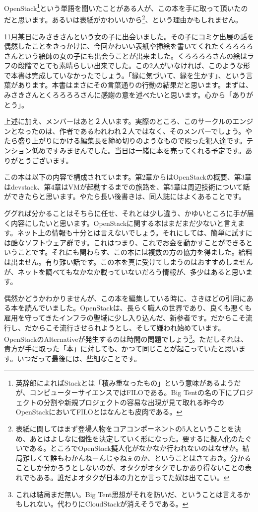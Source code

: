 \documentclass[8pt,b5paper,tombo,openany]{jsbook}
\begin{document}
OpenStack\footnote{英辞郎によればStackとは「積み重なったもの」という意味があるようだが、コンピューターサイエンスではFILOである。Big Tentの名の下にプロジェクトの分割や新規プロジェクトの容易な出現が見て取れる昨今のOpenStackにおいてFILOとはなんとも皮肉である。}という単語を聞いたことがある人が、この本を手に取って頂いたのだと思います。あるいは表紙がかわいいから\footnote{表紙に関してはまず登場人物をコアコンポーネントの5人ということを決め、あとはよしなに個性を決定していく形になった。要するに擬人化のたぐいである。ところでOpenStack擬人化がなかなか行われないのはなぜか。結局難しくて誰もわかんねーんじゃねぇのか、ということはさておき。分かることしか分かろうとしないのが、オタクがオタクでしかあり得ないことの表れでもある。誰だよオタクが日本の力とか言ってた奴は出てこい。}、という理由かもしれません。

11月某日にみさきさんという女の子に出会いました。その子にコミケ出展の話を偶然したことをきっかけに、今回かわいい表紙や挿絵を書いてくれたくろろろろさんという絵師の女の子にも出会うことが出来ました。くろろろろさんの絵はラフの段階でとても素晴らしい出来でした。この2人がいなければ、このような形で本書は完成していなかったでしょう。「縁に気づいて、縁を生かす」、という言葉があります。本書はまさにその言葉通りの行動の結果だと思います。まずは、みさきさんとくろろろろさんに感謝の意を述べたいと思います。心から「ありがとう」。

上述に加え、メンバーはあと２人います。実際のところ、このサークルのエンジンとなったのは、作者であるわれわれ２人ではなく、そのメンバーでしょう。やたら盛り上がりにかける編集長を締め切りのようなもので殴った犯人達です。テンション低めですみませんでした。当日は一緒に本を売ってくれる予定です。ありがとうございます。

この本は以下の内容で構成されています。第2章からはOpenStackの概要、第3章はdevstack、第4章はVMが起動するまでの旅路を、第5章は周辺技術について話ができたらと思います。やたら長い後書きは、同人誌にはよくあることです。

ググれば分かることはそちらに任せ、それとは少し違う、かゆいところに手が届く内容にしたいと思います。OpenStackに関する本はまだまだ少ないと言えます。ネット上の情報も十分とは言えないでしょう。それにしては、簡単に試すには酷なソフトウェア群です。これはつまり、これでお金を動かすことができるということです。それにも関わらす、この本には複数の方の協力を得ました。給料は出ません。有り難い話です。この本を真に受けてしまうのはおすすめしませんが、ネットを調べてもなかなか載っていないだろう情報が、多少はあると思います。

偶然かどうかわかりませんが、この本を編集している時に、さきほどの引用にある本を読んでいました。OpenStackは、長らく職人の世界であり、良くも悪くも雇用を守ってきたインフラの聖域に少し入り込んだ、新参者です。だからこそ流行し、だからこそ流行させられようとし、そして嫌われ始めています。OpenStackのAlternativeが発生するのは時間の問題でしょう\footnote{これは結局まだ無い。Big Tent思想がそれを防いだ、ということは言えるかもしれない。代わりにCloudStackが消えそうである。}。ただしそれは、貴方が手に取った「本」に対しても、かつて同じことが起こっていたと思います。いつだって最後には、些細なことです。
\end{document}

